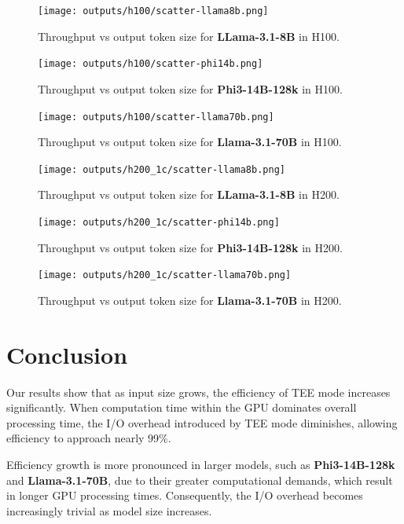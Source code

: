 \documentclass{article}
\begin{document}
\begin{figure}[ht!]
    \centering
    \texttt{[image: outputs/h100/scatter-llama8b.png]}
    \caption{Throughput vs output token size for \textbf{LLama-3.1-8B} in H100.}
    \label{fig:scatter-llama8b-h100}
\end{figure}

\begin{figure}[ht!]
    \centering
    \texttt{[image: outputs/h100/scatter-phi14b.png]}
    \caption{Throughput vs output token size for \textbf{Phi3-14B-128k} in H100.}
    \label{fig:scatter-phi14b-h100}
\end{figure}

\begin{figure}[ht!]
    \centering
    \texttt{[image: outputs/h100/scatter-llama70b.png]}
    \caption{Throughput vs output token size for \textbf{Llama-3.1-70B} in H100.}
    \label{fig:scatter-llama70b-h100}
\end{figure}

\begin{figure}[ht!]
    \centering
    \texttt{[image: outputs/h200\_1c/scatter-llama8b.png]}
    \caption{Throughput vs output token size for \textbf{LLama-3.1-8B} in H200.}
    \label{fig:scatter-llama8b-h200}
\end{figure}

\begin{figure}[ht!]
    \centering
    \texttt{[image: outputs/h200\_1c/scatter-phi14b.png]}
    \caption{Throughput vs output token size for \textbf{Phi3-14B-128k} in H200.}
    \label{fig:scatter-phi14b-h200}
\end{figure}

\begin{figure}[ht!]
    \centering
    \texttt{[image: outputs/h200\_1c/scatter-llama70b.png]}
    \caption{Throughput vs output token size for \textbf{Llama-3.1-70B} in H200.}
    \label{fig:scatter-llama70b-h200}
\end{figure}

\section{Conclusion}

Our results show that as input size grows, the efficiency of TEE mode increases significantly. When computation time within the GPU dominates overall processing time, the I/O overhead introduced by TEE mode diminishes, allowing efficiency to approach nearly 99\%.

Efficiency growth is more pronounced in larger models, such as \textbf{Phi3-14B-128k} and \textbf{Llama-3.1-70B}, due to their greater computational demands, which result in longer GPU processing times. Consequently, the I/O overhead becomes increasingly trivial as model size increases.
\end{document}
